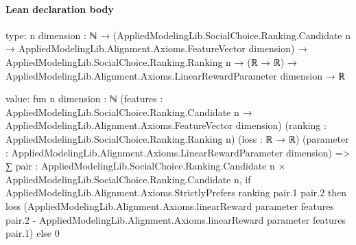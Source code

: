 \documentclass[10pt]{article}
\begin{document}
\paragraph{Lean declaration body}
\begin{ReviewVerbatim}
type:
{n dimension : ℕ} →
  (AppliedModelingLib.SocialChoice.Ranking.Candidate n → AppliedModelingLib.Alignment.Axioms.FeatureVector dimension) →
    AppliedModelingLib.SocialChoice.Ranking.Ranking n →
      (ℝ → ℝ) → AppliedModelingLib.Alignment.Axioms.LinearRewardParameter dimension → ℝ

value:
fun {n dimension : ℕ}
    (features :
      AppliedModelingLib.SocialChoice.Ranking.Candidate n → AppliedModelingLib.Alignment.Axioms.FeatureVector dimension)
    (ranking : AppliedModelingLib.SocialChoice.Ranking.Ranking n) (loss : ℝ → ℝ)
    (parameter : AppliedModelingLib.Alignment.Axioms.LinearRewardParameter dimension) =>
  ∑ pair : AppliedModelingLib.SocialChoice.Ranking.Candidate n × AppliedModelingLib.SocialChoice.Ranking.Candidate n,
    if AppliedModelingLib.Alignment.Axioms.StrictlyPrefers ranking pair.1 pair.2 then
      loss
        (AppliedModelingLib.Alignment.Axioms.linearReward parameter features pair.2 -
          AppliedModelingLib.Alignment.Axioms.linearReward parameter features pair.1)
    else 0
\end{ReviewVerbatim}
\end{document}
